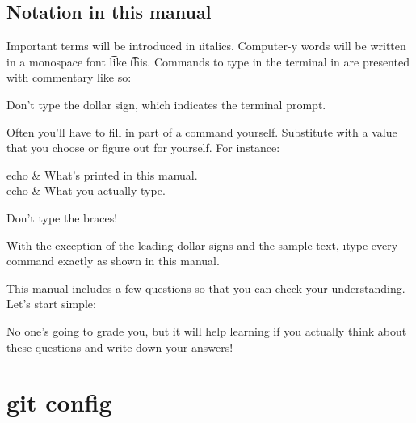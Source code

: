 \documentclass[letterpaper, 12pt, titlepage, twoside]{article}
\begin{document}
\subsection*{Notation in this manual}

Important terms will be introduced in \i{italics}. Computer-y words will be
written in a monospace font \t{like} \t{this}. Commands to type in the
terminal in are presented with commentary like so:


Don't type the dollar sign, which indicates the terminal prompt.

Often you'll have to fill in part of a command yourself. Substitute  with a value that you choose or figure out for yourself. For instance:

\begin{typeme}
echo  & What's printed in this manual. \\
echo \the\year & What you actually type.
\end{typeme}

Don't type the braces!


With \x the exception of the leading dollar signs and the sample text, \i{type
  every command exactly as shown in this manual}.

This manual includes a few questions so that you can check your understanding.
Let's start simple:


No one's going to grade you, but it will help learning if you actually think
about these questions and write down your answers!


\section{git config}

\end{document}
